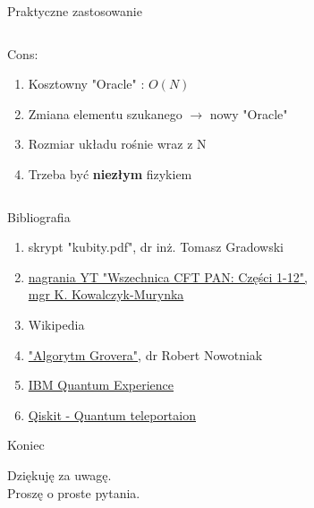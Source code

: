 \documentclass{beamer}
\begin{document}
\begin{frame}{Praktyczne zastosowanie}
\begin{columns}
				\begin{column}{0.5\textwidth}
					\begin{center}
					 	Cons:\\
						\begin{enumerate}
							\item Kosztowny "Oracle" : $O(N)$
							\item Zmiana elementu szukanego $ \longrightarrow $ nowy "Oracle"
							\item Rozmiar układu rośnie wraz z N
							\item Trzeba być \textbf{niezłym} fizykiem
						\end{enumerate}
					\end{center}	
				\end{column}
			\end{columns}
			\vspace{1em}
	\end{frame}
	
	
	
	
	
	\begin{frame}{Bibliografia}
		\begin{block}{}
			\vspace{0.5em}
			\begin{enumerate}
			\item skrypt "kubity.pdf", dr inż. Tomasz Gradowski 
			\item \href{https://www.youtube.com/watch?v=puRu_wEsbAA}{nagrania YT "Wszechnica CFT PAN: Części 1-12",\\ mgr K. Kowalczyk-Murynka}
			\item Wikipedia 
			\item \href{https://robert.nowotniak.com/files/papers/grover.pdf}{"Algorytm Grovera"}, dr Robert Nowotniak
			\item \href{https://quantum-computing.ibm.com/}{IBM Quantum Experience}
			\item \href{https://qiskit.org/textbook/ch-algorithms/teleportation.html}{Qiskit - Quantum teleportaion}
			\end{enumerate}
			\vspace{0.5em}
		\end{block}	
	\end{frame}

	\begin{frame}{Koniec}
		\begin{block}{}
			\vspace{0.5em}
			\begin{center}
				Dziękuję za uwagę.\\
				Proszę o {\huge proste} pytania.
			\end{center}
			\vspace{0.5em}
		\end{block}
	\end{frame}
	
\end{document}
